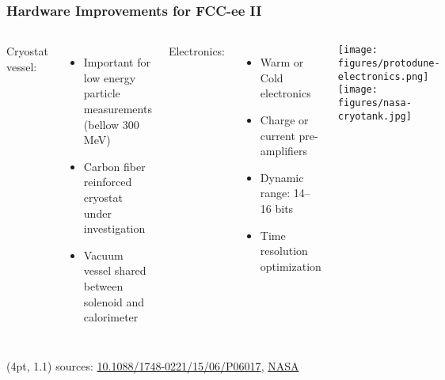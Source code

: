 \documentclass[aspectratio=169]{beamer}
\newcommand{\bluetext}[1]{%
  \textcolor{myBlue}{#1}
}
\begin{document}
\begin{frame}
  \frametitle{Hardware Improvements for FCC-ee II}

  \begin{columns}[c]

    \vspace*{-1em}
    \bluetext{Cryostat vessel:}
    \begin{itemize}
      \item Important for low energy particle measurements (bellow 300 MeV)
      \item Carbon fiber reinforced cryostat under investigation
      \item Vacuum vessel shared between solenoid and calorimeter
    \end{itemize}
    \bluetext{Electronics:}
    \begin{itemize}
      \item Warm or Cold electronics
      \item Charge or current pre-amplifiers
      \item Dynamic range: 14--16 bits
      \item Time resolution optimization
    \end{itemize}


    \begin{center}
      \texttt{[image: figures/protodune-electronics.png]}\\[0.5em]
      \texttt{[image: figures/nasa-cryotank.jpg]}
    \end{center}
  \end{columns}

  \begin{textblock*}{\paperwidth}(4pt, 1.1\textheight)
    \tiny sources:
    \href{https://doi.org/10.1088/1748-0221/15/06/P06017}
         {10.1088/1748-0221/15/06/P06017},
    \href{https://www.nasa.gov/directorates/spacetech/game_changing_development/projects/archived/CCTD}
         {NASA}
  \end{textblock*}
\end{frame}
\end{document}
